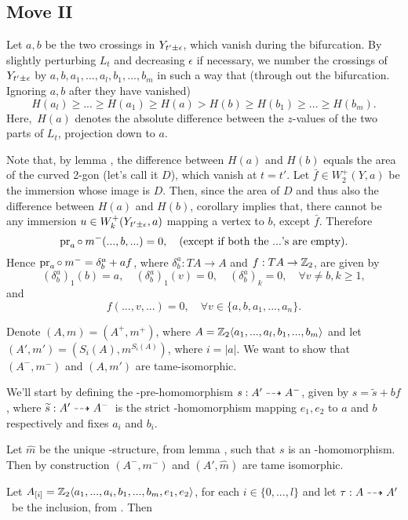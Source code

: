 
\subsection{Move II}
Let $a,b$ be the two crossings in $Y_{t'\pm\epsilon}$, which vanish during the
bifurcation. By slightly perturbing $L_t$ and decreasing $\epsilon$ if necessary,
we number the crossings of $Y_{t'\pm\epsilon}$ by $a,b,a_1,...,a_l,b_1,...,b_m$ in such a way
that (through out the bifurcation. Ignoring $a,b$ after they have vanished)
\[ H(a_l) \ge ... \ge H(a_1) \ge H(a) > H(b) \ge H(b_1) \ge ... \ge
H(b_m). \]
Here, $H(a)$ denotes the absolute difference between the $z$-values of the two
parts of $L_t$, projection down to $a$.

Note that, by lemma , the difference between $H(a)$ and $H(b)$
equals the area of the curved 2-gon (let's call it $D$), which vanish at $t=t'$.  
Let $\bar{f} \in W^+_2(Y,a)$ be the immersion whose image is $D$. Then,
since the area of $D$ and thus also the difference between $H(a)$ and
$H(b)$, corollary  implies that, there cannot be any
immersion $u \in W^+_k(Y_{t'\pm\epsilon}, a)$ mapping a vertex to $b$, except $\bar{f}$.
Therefore 
\[ \operatorname{pr}_a \circ\: m^-(...,b,...) = 0,\quad \text{(except if both the $...$'s are
empty)}. \]
Hence $\operatorname{pr}_a \circ\: m^- = \delta^a_b + a f$, where $\delta^a_b:
TA \to A$ and $f: TA \to \mathbb{Z}_2$, are given by
\[(\delta^a_b)_1(b) = a, \quad  (\delta^a_b)_1(v) = 0, \quad (\delta^a_b)_k = 0, \quad
\forall v \ne b, k \ge 1,\]
and 
\[ f(...,v,...) = 0, \quad \forall v \in \{ a,b,a_1,...,a_n \}. \]

Denote $(A,m) = (A^+, m^+)$, where $A=\mathbb{Z}_2\langle a_1,...,a_l,b_1,...,b_m \rangle$ and
let $(A', m') = (S_i(A),m^{S_i(A)})$, where $i = |a|$. 
We want to show that $(A^-, m^-)$ and $(A, m')$ are tame-isomorphic. 

We'll start by defining the \Ainf-pre-homomorphism $s: A' \dashrightarrow A^-$, given by 
$s = \tilde{s} + b f$, where $\widetilde{s}: A' \dashrightarrow A^-$ is the strict
\Ainf-homomorphism mapping $e_1, e_2$ to $a$ and $b$ respectively and fixes $a_i$ and $b_i$.

\newcommand{\hm}{\widehat{m}}

Let $\hm$ be the unique \Ainf-structure, from lemma 
, such that $s$ is an
\Ainf-homomorphism. Then by construction $(A^-, m^-)$ and $(A',
\hm)$ are tame isomorphic. 

Let $A_{[i]} = \mathbb{Z}_2\langle a_1,...,a_i, b_1,...,b_m, e_1,e_2 \rangle$, for each $i\in
\{0,...,l\}$ and let $\tau : A \dashrightarrow A'$ be the inclusion, from
. Then

